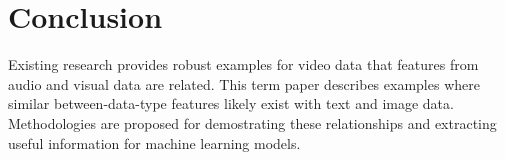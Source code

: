 \section{Conclusion}
Existing research provides robust examples for video data that features from audio and visual data are related.  This term paper describes examples where similar between-data-type features likely exist with text and image data.  Methodologies are proposed for demostrating these relationships and extracting useful information for machine learning models.  
